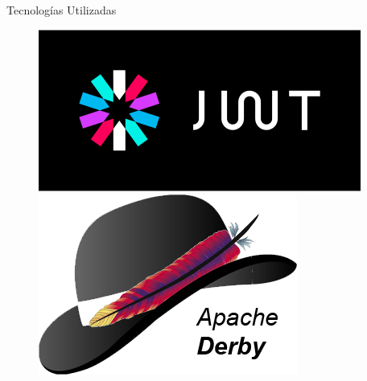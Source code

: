 \documentclass{beamer}
\begin{document}
\begin{frame}{Tecnologías Utilizadas}
\begin{figure}
\begin{minipage}{0.25\textwidth}
                    \end{minipage}
                    \begin{minipage}{0.25\textwidth}
                        \includegraphics[width=\textwidth]{res/logo-jwt}
                    \end{minipage}
                    \begin{minipage}{0.25\textwidth}
                        \includegraphics[width=\textwidth]{res/logo-derby}
                    \end{minipage}
                \end{figure}
            \end{frame}
\end{document}
